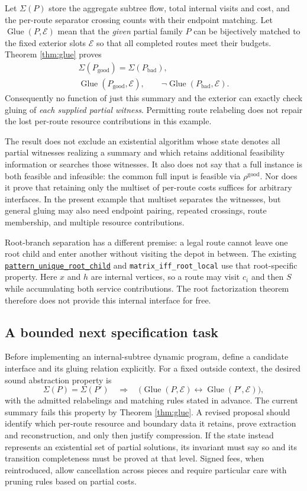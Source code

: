 \documentclass[11pt]{article}
\theoremstyle{remark}
\newcommand{\code}[1]{\nolinkurl{#1}}
\newcommand{\src}[2]{\href{https://github.com/huam54925-cpu/uav-routing-certification/blob/1bc992475a9bd515d77245e2bc0471e5ecab2fd5/LeanCompletion/UAV/#1.lean}{#2}}
\begin{document}
Let $\Sigma(P)$ store the aggregate subtree flow, total internal visits and cost, and the per-route separator crossing counts with their endpoint matching.
Let $\operatorname{Glue}(P,\mathcal E)$ mean that the \emph{given} partial family $P$ can be bijectively matched to the fixed exterior slots $\mathcal E$ so that all completed routes meet their budgets.
Theorem \ref{thm:glue} proves
\begin{gather*}
 \Sigma(P_{\mathrm{good}})=\Sigma(P_{\mathrm{bad}}),\\
 \operatorname{Glue}(P_{\mathrm{good}},\mathcal E),\qquad
 \neg\operatorname{Glue}(P_{\mathrm{bad}},\mathcal E).
\end{gather*}
Consequently no function of just this summary and the exterior can exactly check gluing of \emph{each supplied partial witness}.
Permitting route relabeling does not repair the lost per-route resource contributions in this example.

The result does not exclude an existential algorithm whose state denotes all partial witnesses realizing a summary and which retains additional feasibility information or searches those witnesses.
It also does not say that a full instance is both feasible and infeasible: the common full input is feasible via $\rho^{\mathrm{good}}$.
Nor does it prove that retaining only the multiset of per-route costs suffices for arbitrary interfaces.
In the present example that multiset separates the witnesses, but general gluing may also need endpoint pairing, repeated crossings, route membership, and multiple resource contributions.

Root-branch separation has a different premise: a legal route cannot leave one root child and enter another without visiting the depot in between.
The existing \src{TreeBudgetRootFactorization}{\code{pattern_unique_root_child}} and
\code{matrix_iff_root_local} use that root-specific property.
Here $x$ and $h$ are internal vertices, so a route may visit $c_i$ and then $S$ while accumulating both service contributions.
The root factorization theorem therefore does not provide this internal interface for free.

\subsection{A bounded next specification task}
Before implementing an internal-subtree dynamic program, define a candidate interface and its gluing relation explicitly.
For a fixed outside context, the desired sound abstraction property is
\[
 \Sigma(P)=\Sigma(P')\quad\Longrightarrow\quad
 \bigl(\operatorname{Glue}(P,\mathcal E)
       \longleftrightarrow\operatorname{Glue}(P',\mathcal E)\bigr),
\]
with the admitted relabelings and matching rules stated in advance.
The current summary fails this property by Theorem \ref{thm:glue}.
A revised proposal should identify which per-route resource and boundary data it retains, prove extraction and reconstruction, and only then justify compression.
If the state instead represents an existential set of partial solutions, its invariant must say so and its transition completeness must be proved at that level.
Signed fees, when reintroduced, allow cancellation across pieces and require particular care with pruning rules based on partial costs.
\end{document}
